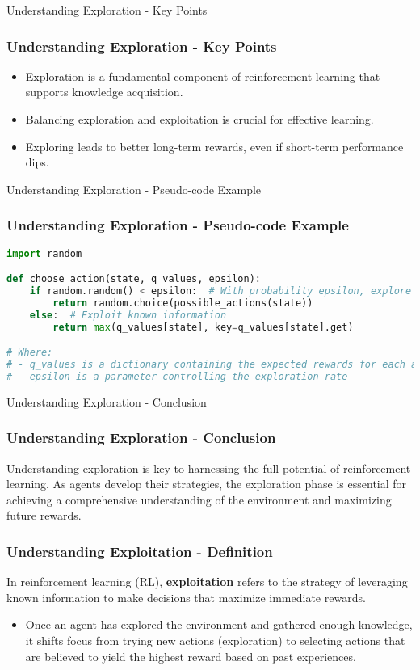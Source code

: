 \documentclass[aspectratio=169]{beamer}
\begin{document}
\begin{frame}[fragile]{Understanding Exploration - Key Points}
    \frametitle{Understanding Exploration - Key Points}
    \begin{itemize}
        \item Exploration is a fundamental component of reinforcement learning that supports knowledge acquisition.
        \item Balancing exploration and exploitation is crucial for effective learning.
        \item Exploring leads to better long-term rewards, even if short-term performance dips.
    \end{itemize}
\end{frame}

\begin{frame}[fragile]{Understanding Exploration - Pseudo-code Example}
    \frametitle{Understanding Exploration - Pseudo-code Example}
    \begin{lstlisting}[language=Python]
import random

def choose_action(state, q_values, epsilon):
    if random.random() < epsilon:  # With probability epsilon, explore
        return random.choice(possible_actions(state))
    else:  # Exploit known information
        return max(q_values[state], key=q_values[state].get)

# Where:
# - q_values is a dictionary containing the expected rewards for each action
# - epsilon is a parameter controlling the exploration rate
    \end{lstlisting}
\end{frame}

\begin{frame}[fragile]{Understanding Exploration - Conclusion}
    \frametitle{Understanding Exploration - Conclusion}
    Understanding exploration is key to harnessing the full potential of reinforcement learning. As agents develop their strategies, the exploration phase is essential for achieving a comprehensive understanding of the environment and maximizing future rewards.
\end{frame}

\begin{frame}[fragile]
    \frametitle{Understanding Exploitation - Definition}
    In reinforcement learning (RL), \textbf{exploitation} refers to the strategy of leveraging known information to make decisions that maximize immediate rewards. 
    \begin{itemize}
        \item Once an agent has explored the environment and gathered enough knowledge, it shifts focus from trying new actions (exploration) to selecting actions that are believed to yield the highest reward based on past experiences.
    \end{itemize}
\end{frame}
\end{document}
